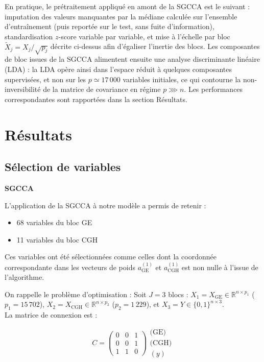 \documentclass[a4paper,11pt]{paper}
\theoremstyle{plain}
\theoremstyle{definition}
\theoremstyle{remark}
\begin{document}
En pratique, le prétraitement appliqué en amont de la SGCCA est le suivant : imputation des valeurs manquantes par la médiane calculée sur l'ensemble d'entraînement (puis reportée sur le test, sans fuite d'information), standardisation $z$-score variable par variable, et mise à l'échelle par bloc $\tilde X_j = X_j/\sqrt{p_j}$ décrite ci-dessus afin d'égaliser l'inertie des blocs. Les composantes de bloc issues de la SGCCA alimentent ensuite une analyse discriminante linéaire (LDA) : la LDA opère ainsi dans l'espace réduit à quelques composantes supervisées, et non sur les $p \simeq 17\,000$ variables initiales, ce qui contourne la non-inversibilité de la matrice de covariance en régime $p \ggg n$. Les performances correspondantes sont rapportées dans la section Résultats.

\section{Résultats}
\label{sec:resultats}

\subsection{Sélection de variables}

\begin{center}
    \Large \textbf{SGCCA}
\end{center}

L'application de la SGCCA à notre modèle a permis de retenir :
\begin{itemize}
    \item 68 variables du bloc GE
    \item 11 variables du bloc CGH
\end{itemize}
Ces variables ont été sélectionnées comme celles dont la coordonnée correspondante dans les vecteurs de poids $a_{\text{GE}}^{(1)}$ et $a_{\text{CGH}}^{(1)}$ est non nulle à l'issue de l'algorithme.

On rappelle le problème d'optimisation : Soit $J = 3$ blocs : $X_1 = X_{\text{GE}} \in \mathbb{R}^{n \times p_1}$ ($p_1 = 15\,702$), $X_2 = X_{\text{CGH}} \in \mathbb{R}^{n \times p_2}$ ($p_2 = 1\,229$), et $X_3 = Y \in \{0,1\}^{n \times 3}$. \\
La matrice de connexion est :

$$
    C =
    \begin{pmatrix}
        0 & 0 & 1 \\
        0 & 0 & 1 \\
        1 & 1 & 0
    \end{pmatrix}
    \begin{matrix}
        \text{(GE)} \\ \text{(CGH)} \\ (y)
    \end{matrix}
$$
\end{document}
